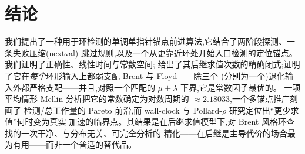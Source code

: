 \documentclass[11pt]{ctexart}
\begin{document}
\section{结论}
\label{sec:conclusion}

我们提出了一种用于环检测的单调单指针锚点前进算法,它结合了两阶段探测、一条失败压缩(nextval)
跳过规则,以及一个从更靠近环处开始入口检测的定位锚点。我们证明了正确性、线性时间与常数空间;
给出了其后继求值次数的精确闭式;证明了它在\emph{每个}环形输入上都弱支配 Brent 与 Floyd——除三个
(分别为一个)退化输入外都严格支配——并且,对照一个匹配的 $\mu+\lambda$ 下界,它是常数因子最优的。
一项平均情形 Mellin 分析把它的常数确定为对数周期的 $\approx2.18033$,一个多锚点推广刻画了
检测/总工作量的 Pareto 前沿,而 wall-clock 与 Pollard-$\rho$ 研究定位出``更少求值''何时变为真实
加速的临界点。其结果是在后继求值模型下,对 Brent 风格环查找的一次干净、与分布无关、可完全分析的
精化——在后继是主导代价的场合最为有用——而非一个普适的替代品。
\end{document}
